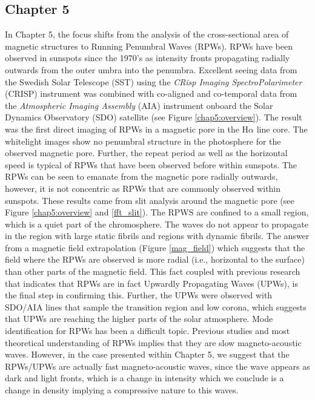 	\subsection{Chapter 5}
    
    In Chapter 5, the focus shifts from the analysis of the cross-sectional area of magnetic structures to Running Penumbral Waves (RPWs).
    RPWs have been observed in sunspots since the 1970's as intensity fronts propagating radially outwards from the outer umbra into the penumbra.
    Excellent seeing data from the Swedish Solar Telescope (SST) using the \textit{CRisp Imaging SpectroPolarimeter} (CRISP) instrument was combined with co-aligned and co-temporal data from the \textit{Atmospheric Imaging Assembly} (AIA) instrument onboard the Solar Dynamics Observatory (SDO) satellite (see Figure \ref{chap5:overview}).
    The result was the first direct imaging of RPWs in a magnetic pore in the H$\alpha$ line core.
    The whitelight images show no penumbral structure in the photosphere for the observed magnetic pore.
    Further, the repeat period as well as the horizontal speed is typical of RPWs that have been observed before within sunspots.
    The RPWs can be seen to emanate from the magnetic pore radially outwards, however, it is not concentric as RPWs that are commonly observed within sunspots.
    These results came from slit analysis around the magnetic pore (see Figure \ref{chap5:overview} and \ref{fft_slit}).
    The RPWS are confined to a small region, which is a quiet part of the chromosphere.
    The waves do not appear to propagate in the region with large static fibrils and regions with dynamic fibrils.
    The answer from a magnetic field extrapolation (Figure \ref{mag_field}) which suggests that the field where the RPWs are observed is more radial (i.e., horizontal to the surface) than other parts of the magnetic field.
    This fact coupled with previous research that indicates that RPWs are in fact Upwardly Propagating Waves (UPWs), is the final step in confirming this.     
    Further, the UPWs were observed with SDO/AIA lines that sample the transition region and low corona, which suggests that UPWs are reaching the higher parts of the solar atmosphere.
    Mode identification for RPWs has been a difficult topic. 
    Previous studies and most theoretical understanding of RPWs implies that they are slow magneto-acoustic waves.
    However, in the case presented within Chapter 5, we suggest that the RPWs/UPWs are actually fast magneto-acoustic waves, since the wave appears as dark and light fronts, which is a change in intensity which we conclude is a change in density implying a compressive nature to this waves.
